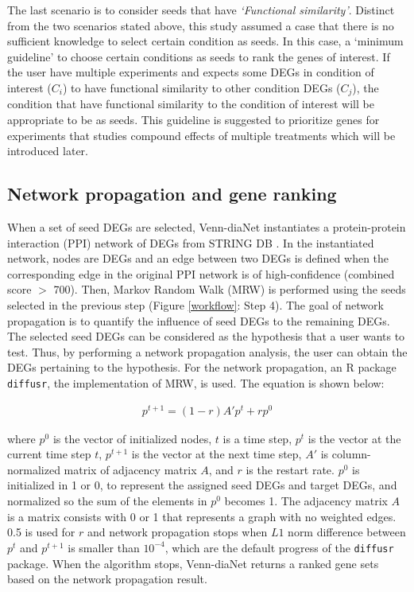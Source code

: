 \documentclass[oneside,phd]{snuthesis}
\begin{document}
The last scenario is to consider seeds that have \textit{`Functional similarity'}. 
Distinct from the two scenarios stated above, this study assumed a case that there is no sufficient knowledge to select certain condition as seeds. 
In this case, a `minimum guideline' to choose certain conditions as seeds to rank the genes of interest.
If the user have multiple experiments and expects some DEGs in condition of interest ($C_{i}$) to have functional similarity to other condition DEGs ($C_{j}$), the condition that have functional similarity to the condition of interest will be appropriate to be as seeds. 
This guideline is suggested to prioritize genes for experiments that studies compound effects of multiple treatments which will be introduced later.


\subsection{Network propagation and gene ranking}

When a set of seed DEGs are selected, Venn-diaNet instantiates a protein-protein interaction (PPI) network of DEGs from STRING DB \citep{szklarczyk2014string}.
In the instantiated network, nodes are DEGs and an edge between two DEGs is defined when the corresponding edge in the original PPI network is of high-confidence (combined score $>$ 700).
Then, Markov Random Walk (MRW) \citep{diffusr} is performed using the seeds selected in the previous step (Figure \ref{workflow}: Step 4). 
The goal of network propagation is to quantify the influence of seed DEGs to the remaining DEGs. 
The selected seed DEGs can be considered as the hypothesis that a user wants to test. 
Thus, by performing a network propagation analysis, the user can obtain the DEGs pertaining to the hypothesis. 
For the network propagation, an R package {\tt diffusr}, the implementation of MRW, is used. The equation is shown below:

\begin{ceqn}
\begin{align*}
p^{t+1}=(1-r)A'p^t+rp^0
\end{align*}
\end{ceqn}

where $p^0$ is the vector of initialized nodes, $t$ is a time step, $p^t$ is the vector at the current time step $t$, $p^{t+1}$ is the vector at the next time step, $A'$ is column-normalized matrix of adjacency matrix $A$, and $r$ is the restart rate.
$p^0$ is initialized in 1 or 0, to represent the assigned seed DEGs and target DEGs, and normalized so the sum of the elements in $p^0$ becomes 1. 
The adjacency matrix $A$ is a matrix consists with 0 or 1 that represents a graph with no weighted edges. 
0.5 is used for $r$ and network propagation stops when $L1$ norm difference between $p^{t}$ and $p^{t+1}$ is smaller than $10^{-4}$, which are the default progress of the {\tt diffusr} package. 
When the algorithm stops, Venn-diaNet returns a ranked gene sets based on the network propagation result.
\end{document}
